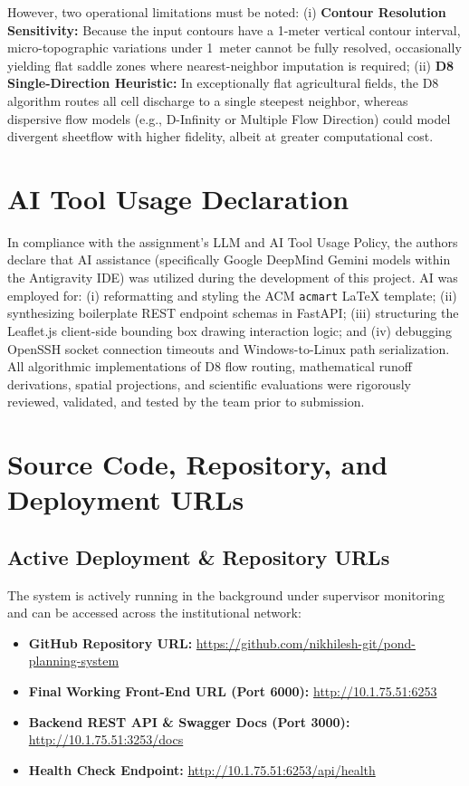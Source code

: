 \documentclass[manuscript,screen,review]{acmart}
\begin{document}
However, two operational limitations must be noted: (i) \textbf{Contour Resolution Sensitivity:} Because the input contours have a 1-meter vertical contour interval, micro-topographic variations under 1~meter cannot be fully resolved, occasionally yielding flat saddle zones where nearest-neighbor imputation is required; (ii) \textbf{D8 Single-Direction Heuristic:} In exceptionally flat agricultural fields, the D8 algorithm routes all cell discharge to a single steepest neighbor, whereas dispersive flow models (e.g., D-Infinity or Multiple Flow Direction) could model divergent sheetflow with higher fidelity, albeit at greater computational cost.

\section{AI Tool Usage Declaration}
\label{sec:ai-usage}
In compliance with the assignment's LLM and AI Tool Usage Policy, the authors declare that AI assistance (specifically Google DeepMind Gemini models within the Antigravity IDE) was utilized during the development of this project. AI was employed for: (i) reformatting and styling the ACM \texttt{acmart} LaTeX template; (ii) synthesizing boilerplate REST endpoint schemas in FastAPI; (iii) structuring the Leaflet.js client-side bounding box drawing interaction logic; and (iv) debugging OpenSSH socket connection timeouts and Windows-to-Linux path serialization. All algorithmic implementations of D8 flow routing, mathematical runoff derivations, spatial projections, and scientific evaluations were rigorously reviewed, validated, and tested by the team prior to submission.

\appendix

\section{Source Code, Repository, and Deployment URLs}
\label{sec:appendix}

\subsection{Active Deployment \& Repository URLs}
The system is actively running in the background under supervisor monitoring and can be accessed across the institutional network:
\begin{itemize}
    \item \textbf{GitHub Repository URL:} \url{https://github.com/nikhilesh-git/pond-planning-system}
    \item \textbf{Final Working Front-End URL (Port 6000):} \url{http://10.1.75.51:6253}
    \item \textbf{Backend REST API \& Swagger Docs (Port 3000):} \url{http://10.1.75.51:3253/docs}
    \item \textbf{Health Check Endpoint:} \url{http://10.1.75.51:6253/api/health}
\end{itemize}
\end{document}
